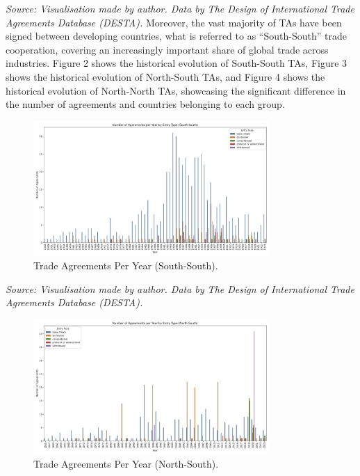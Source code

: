\documentclass[12pt]{article}%
\begin{document}
%
\FloatBarrier%
\textit{Source: Visualisation made by author. Data by The Design of International Trade Agreements Database (DESTA).}%
\FloatBarrier%
Moreover, the vast majority of TAs have been signed between developing countries, what is referred to as “South{-}South” trade cooperation, covering an increasingly important share of global trade across industries. Figure 2 shows the historical evolution of South{-}South TAs, Figure 3 shows the historical evolution of North{-}South TAs, and Figure 4 shows the historical evolution of North{-}North TAs, showcasing the significant difference in the number of agreements and countries belonging to each group.%


\begin{figure}[h!]%
\centering%
\includegraphics[width=0.8\textwidth]{figures/agreements_per_year_South-South.jpg}%
\caption{Trade Agreements Per Year (South{-}South).}%
\end{figure}

%
\FloatBarrier%
\textit{Source: Visualisation made by author. Data by The Design of International Trade Agreements Database (DESTA).}%
\FloatBarrier%


\begin{figure}[h!]%
\centering%
\includegraphics[width=0.8\textwidth]{figures/agreements_per_year_North-South.jpg}%
\caption{Trade Agreements Per Year (North{-}South).}%
\end{figure}
\end{document}
